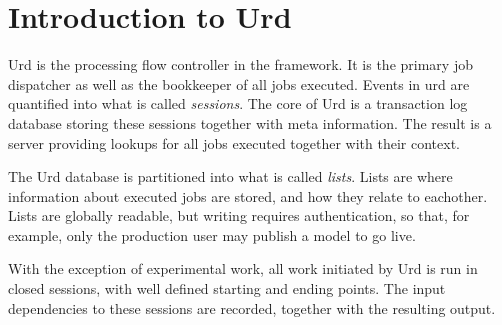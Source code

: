 
\section{Introduction to Urd}

Urd is the processing flow controller in the framework.  It is the
primary job dispatcher as well as the bookkeeper of all jobs executed.
Events in urd are quantified into what is called \textsl{sessions}.
The core of Urd is a transaction log database storing these sessions
together with meta information.  The result is a server providing
lookups for all jobs executed together with their context.

The Urd database is partitioned into what is called \textsl{lists}.
Lists are where information about executed jobs are stored, and how
they relate to eachother.  Lists are globally readable, but writing
requires authentication, so that, for example, only the production
user may publish a model to go live.

With the exception of experimental work, all work initiated by Urd is
run in closed sessions, with well defined starting and ending points.
The input dependencies to these sessions are recorded, together with
the resulting output.



